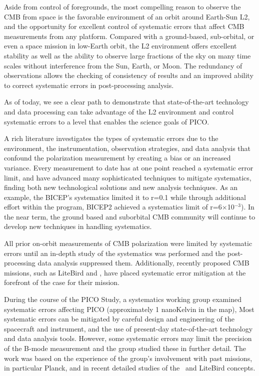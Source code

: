 \documentclass[PICOReport.tex]{subfiles}
\begin{document}
Aside from control of foregrounds, the most compelling reason to observe the CMB from space is the favorable environment of an orbit around Earth-Sun L2, and the opportunity for excellent control of systematic errors that affect CMB measurements from any platform.  
Compared with a ground-based, sub-orbital, or even a space mission in low-Earth orbit, the L2 environment offers excellent stability as well as the ability to observe large fractions of the sky on many time scales without interference from the Sun, Earth, or Moon.
The redundancy of observations allows the checking of consistency of results and an improved ability to correct systematic errors in
post-processing analysis.

As of today, we see a clear path to demonstrate that state-of-the-art technology and data processing can take advantage of the L2 environment and control systematic errors to a level that enables the science goals of PICO. 

A rich literature investigates the types of systematic errors due to the environment, the instrumentation, observation strategies, and data analysis that confound the polarization measurement by creating a bias or an increased variance\cite{hu03,shimon2008,yadav2010}. 
Every measurement to date has at one point reached a systematic error limit, and have advanced many sophisticated techniques to mitigate systematics, finding both new technological solutions and new analysis techniques.
As an example, the BICEP's systematics limited it to r=0.1\cite{Takahaski2010} while through additional effort within the program, BICEP2 achieved a systematics limit of r=6$\times$10$^{-3}$\cite{BICEP2_III}).
In the near term, the ground based and suborbital CMB community will continue to develop new techniques in handling systematics.

All prior on-orbit measurements of CMB polarization were limited by systematic errors until an in-depth study of the systematics was performed and the post-processing data analysis suppressed them\cite{Bennett13,planck2016_xlvi,Planck2018_I}. 
Additionally, recently proposed CMB missions, such as LiteBird and \core, have placed
systematic error mitigation at the forefront of the case for their
mission\cite{hazumi2012,wallis2017,Natoli2018}.

During the course of the PICO Study, a systematics working group
examined systematic errors affecting PICO  (approximately 1 nanoKelvin in the map),
Most  systematic errors can be mitigated by careful design and engineering of 
the spacecraft and instrument, and the use of present-day state-of-the-art
technology and data analysis tools.   
However, some systematic errors may
limit the precision of the B-mode measurement and the group studied
these in further detail. 
The work was based on the experience of the group's involvement with
past missions, in particular Planck, and in recent detailed studies of 
the \core\ and LiteBird  concepts.
\end{document}
